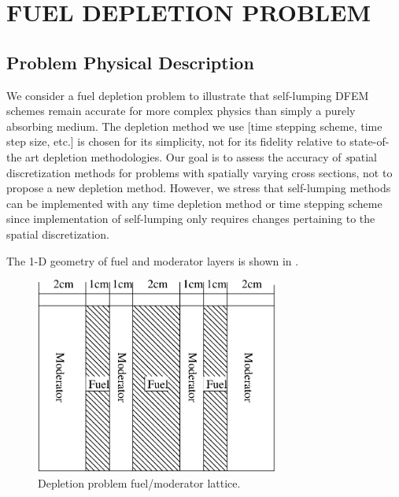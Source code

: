 %
%
%



\chapter{\uppercase{Fuel Depletion Problem}}
\label{sec:chapter5_depletion}

\section{Problem Physical Description}
We consider a fuel depletion problem to illustrate that self-lumping DFEM schemes remain accurate for more complex physics than simply a purely absorbing medium.
The depletion method we use [time stepping scheme, time step size, etc.] is chosen for its simplicity, not for its fidelity relative to state-of-the art depletion methodologies.  
Our goal is to assess the accuracy of {\emph spatial discretization} methods for problems with spatially varying cross sections, not to propose a new depletion method.  
However, we stress that self-lumping methods can be implemented with any time depletion method or time stepping scheme since implementation of self-lumping  only requires changes pertaining to the spatial discretization. 

The 1-D geometry of fuel and moderator layers is shown in .  
\begin{figure}[!htp]
\begin{center}
\includegraphics[width=8cm]{chapter5_depletion/article_grid.pdf}
\end{center}
\caption{Depletion problem fuel/moderator lattice.}
\label{fig:lattice}
\end{figure}

